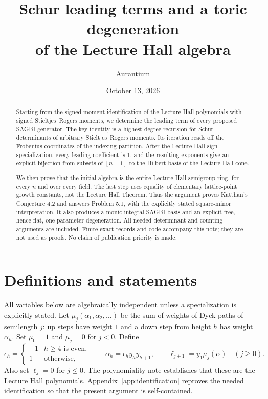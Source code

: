 \documentclass[11pt]{article}
\title{Schur leading terms and a toric degeneration\\of the Lecture Hall algebra}
\author{Aurantium}
\date{October 13, 2026}
\theoremstyle{definition}
\theoremstyle{remark}
\begin{document}
\maketitle
\begin{abstract}
Starting from the signed-moment identification of the Lecture Hall polynomials
with signed Stieltjes--Rogers moments, we determine the leading term of every
proposed SAGBI generator. The key identity is a highest-degree recursion for
Schur determinants of arbitrary Stieltjes--Rogers moments. Its iteration
reads off the Frobenius coordinates of the indexing partition. After the
Lecture Hall sign specialization, every leading coefficient is $1$, and the
resulting exponents give an explicit bijection from subsets of $[n-1]$ to
the Hilbert basis of the Lecture Hall cone.

We then prove that the initial algebra is the entire Lecture Hall semigroup
ring, for every $n$ and over every field. The last step uses equality of
elementary lattice-point growth constants, not the Lecture Hall Theorem.
Thus the argument proves Katth\"an's Conjecture 4.2 and answers Problem 5.1,
with the explicitly stated square-minor interpretation. It also produces a
monic integral SAGBI basis and an explicit free, hence flat, one-parameter
degeneration. All needed determinant and counting arguments are included.
Finite exact records and code accompany this note; they are not used as proofs.
No claim of publication priority is made.
\end{abstract}

\section{Definitions and statements}
All variables below are algebraically independent unless a specialization
is explicitly stated. Let $\mu_j(\alpha_1,\alpha_2,\ldots)$ be the sum of
weights of Dyck paths of semilength $j$: up steps have weight $1$ and a down
step from height $h$ has weight $\alpha_h$. Set $\mu_0=1$ and $\mu_j=0$ for
$j<0$. Define
\begin{equation}\label{eq:weights}
 \epsilon_h=\begin{cases}-1&h\ge4\text{ is even},\\1&\text{otherwise},\end{cases}
 \qquad \alpha_h=\epsilon_h y_hy_{h+1},\qquad
 \ell_{j+1}=y_1\mu_j(\alpha)\quad(j\ge0).
\end{equation}
Also set $\ell_j=0$ for $j\le0$.
The polynomiality note \cite{Polynomiality} establishes that these are the Lecture Hall polynomials.
Appendix~\ref{app:identification} reproves the needed identification so that
the present argument is self-contained.
\end{document}

